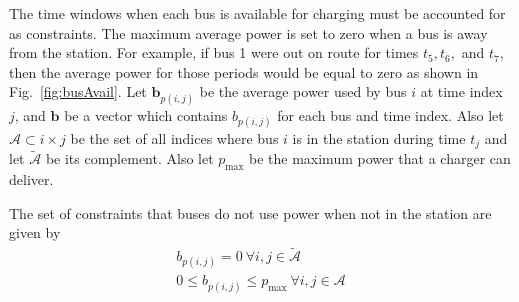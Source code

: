 \par The time windows when each bus is available for charging must be accounted for as constraints.  The maximum average power is set to zero when a bus is away from the station. For example, if bus 1 were out on route for times $t_5, t_6,$ and $t_7$, then the average power for those periods would be equal to zero as shown in Fig.~\ref{fig:busAvail}. Let $\bm{b}_{p(i,j)}$ be the average power used by bus $i$ at time index $j$, and $\bm{b}$ be a vector which contains $b_{p(i,j)}$ for each bus and time index. Also let $\mathcal{A} \subset {i\times j}$  be the set of all indices where bus $i$ is in the station during time $t_j$ and let $\tilde{\mathcal{A}}$ be its complement. Also let $p_{\text{max}}$ be the maximum power that a charger can deliver. 
\par The set of constraints that buses do not use power when not in the station are given by
\begin{gather}\label{eqn:obj:power2}
	b_{p(i,j)} = 0 \ \forall i,j \in \tilde{\mathcal{A}}  \\
	0 \leq b_{p(i,j)} \leq p_{\text{max}} \ \forall i,j \in \mathcal{A}
\end{gather}

